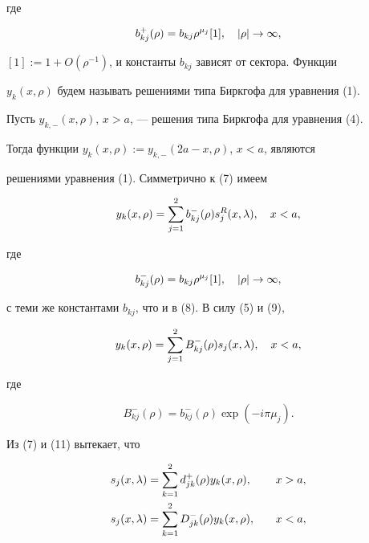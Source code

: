 где


\begin{equation}


b_{kj}^{+}(\rho)=b_{kj}\rho^{\mu_j}[1],\quad |\rho|\to\iy,


\end{equation}


$[1]:=1+O(\rho^{-1})$, и константы $b_{kj}$ зависят от сектора. Функции


$y_k(x,\rho)$ будем называть решениями типа Биркгофа для уравнения (1).





Пусть $y_{k,-}(x,\rho)$, $x>a$, --- решения типа Биркгофа для уравнения (4).


Тогда функции $y_{k}(x,\rho):=y_{k,-}(2a-x,\rho)$, $x<a$, являются


решениями уравнения (1). Симметрично к (7) имеем


\begin{equation}


y_k(x,\rho)=\sum_{j=1}^{2} b_{kj}^{-}(\rho)s_j^R(x,\la),\quad x<a,


\end{equation}


где


\begin{equation}


b_{kj}^{-}(\rho)=b_{kj}\rho^{\mu_j}[1],\quad |\rho|\to\iy,


\end{equation}


с теми же константами $b_{kj}$, что и в (8). В силу (5) и (9),


\begin{equation}


y_k(x,\rho)=\sum_{j=1}^{2} B_{kj}^{-}(\rho)s_j(x,\la),\quad x<a,


\end{equation}


где


\begin{equation}


B_{kj}^{-}(\rho)=b_{kj}^{-}(\rho)\exp(-i\pi\mu_j).


\end{equation}


Из (7) и (11) вытекает, что


\begin{alignat}{2}


s_j(x,\la)&=\sum_{k=1}^{2} d_{jk}^{+}(\rho)y_k(x,\rho),&\quad x&>a,\\


%


s_j(x,\la)&=\sum_{k=1}^{2} D_{jk}^{-}(\rho)y_k(x,\rho),&\quad x&<a,


\end{alignat}


